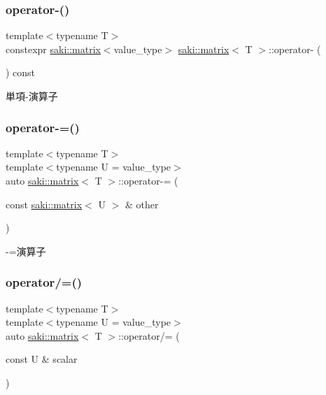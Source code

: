 \subsubsection{\texorpdfstring{operator-\/()}{operator-()}}
{\footnotesize\ttfamily template$<$typename T$>$ \\
constexpr \mbox{\hyperlink{classsaki_1_1matrix}{saki\+::matrix}}$<$value\+\_\+type$>$ \mbox{\hyperlink{classsaki_1_1matrix}{saki\+::matrix}}$<$ T $>$\+::operator-\/ (\begin{DoxyParamCaption}{ }\end{DoxyParamCaption}) const\hspace{0.3cm}{\ttfamily [inline]}}



単項-\/演算子 

\mbox{\label{classsaki_1_1matrix_ae7c736de15ce97ad5d41193beeecf18d}} 
\subsubsection{\texorpdfstring{operator-\/=()}{operator-=()}}
{\footnotesize\ttfamily template$<$typename T$>$ \\
template$<$typename U  = value\+\_\+type$>$ \\
auto \mbox{\hyperlink{classsaki_1_1matrix}{saki\+::matrix}}$<$ T $>$\+::operator-\/= (\begin{DoxyParamCaption}\item[{const \mbox{\hyperlink{classsaki_1_1matrix}{saki\+::matrix}}$<$ U $>$ \&}]{other }\end{DoxyParamCaption})\hspace{0.3cm}{\ttfamily [inline]}}



-\/=演算子 

\mbox{\label{classsaki_1_1matrix_af70c929f45bbea2192aab47d49882d3c}} 
\subsubsection{\texorpdfstring{operator/=()}{operator/=()}}
{\footnotesize\ttfamily template$<$typename T$>$ \\
template$<$typename U  = value\+\_\+type$>$ \\
auto \mbox{\hyperlink{classsaki_1_1matrix}{saki\+::matrix}}$<$ T $>$\+::operator/= (\begin{DoxyParamCaption}\item[{const U \&}]{scalar }\end{DoxyParamCaption})\hspace{0.3cm}{\ttfamily [inline]}}



